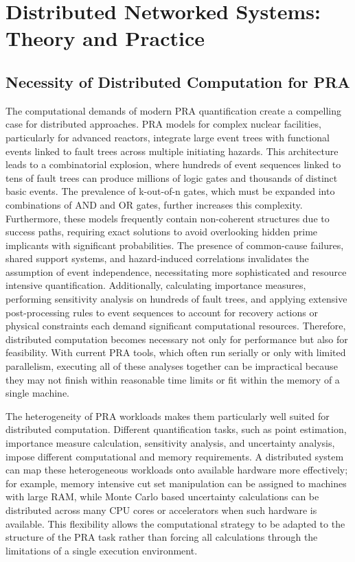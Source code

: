 \chapter{Distributed Networked Systems: Theory and Practice}
\label{chap:distributed-systems}

\section{Necessity of Distributed Computation for PRA}
\label{sec:necessity-ds-pra}
The computational demands of modern PRA quantification create a compelling case for distributed approaches. PRA models for complex nuclear facilities, particularly for advanced reactors, integrate large event trees with functional events linked to fault trees across multiple initiating hazards. This architecture leads to a combinatorial explosion, where hundreds of event sequences linked to tens of fault trees can produce millions of logic gates and thousands of distinct basic events. The prevalence of k-out-of-n gates, which must be expanded into combinations of AND and OR gates, further increases this complexity. Furthermore, these models frequently contain non-coherent structures due to success paths, requiring exact solutions to avoid overlooking hidden prime implicants with significant probabilities. The presence of common-cause failures, shared support systems, and hazard-induced correlations invalidates the assumption of event independence, necessitating more sophisticated and resource intensive quantification. Additionally, calculating importance measures, performing sensitivity analysis on hundreds of fault trees, and applying extensive post-processing rules to event sequences to account for recovery actions or physical constraints each demand significant computational resources. Therefore, distributed computation becomes necessary not only for performance but also for feasibility. With current PRA tools, which often run serially or only with limited parallelism, executing all of these analyses together can be impractical because they may not finish within reasonable time limits or fit within the memory of a single machine.

The heterogeneity of PRA workloads makes them particularly well suited for distributed computation. Different quantification tasks, such as point estimation, importance measure calculation, sensitivity analysis, and uncertainty analysis, impose different computational and memory requirements. A distributed system can map these heterogeneous workloads onto available hardware more effectively; for example, memory intensive cut set manipulation can be assigned to machines with large RAM, while Monte Carlo based uncertainty calculations can be distributed across many CPU cores or accelerators when such hardware is available. This flexibility allows the computational strategy to be adapted to the structure of the PRA task rather than forcing all calculations through the limitations of a single execution environment.

